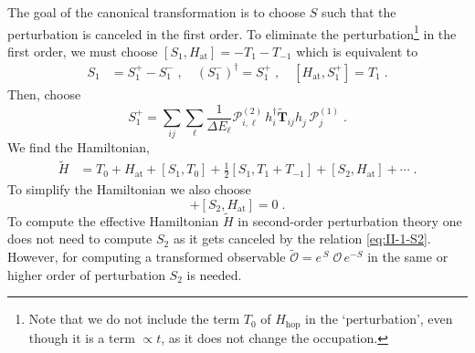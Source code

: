 The goal of the canonical transformation is to choose $S$ such that the perturbation is canceled in the first order.
To eliminate the perturbation\footnote{Note that we do not include the term $T_0$ of $H_{\text{hop}}$ in the `perturbation', even though it is a term $\propto t$, as it does not change the occupation.  } in the first order, we must choose $[S_1, H_{\text{at}}] = - T_1 - T_{-1}$ which is equivalent to
\begin{align}
    S_1 &= S_1^{+} - S_1^{-} \; ,  \quad
    (S_1^{-})^\dagger = S_1^{+} \; , \quad
    [H_{\text{at}},S_1^{+}] =   T_{ 1 } \; . \label{eq:S1}
\end{align}
Then, choose
\begin{equation}
    S_1^{+}  = \sum_{ij}\sum_{\ell} \frac{1}{\Delta E_{\ell}} \mathcal{P}^{(2)}_{i,\ell} \, h_i^\dagger  \tilde{\mathbf{T}}_{ij} h_j^{\phantom{\dagger}} \, \mathcal{P}^{(1)}_{j}  \; .
\end{equation}
We find the Hamiltonian,
\begin{equation}
    \begin{split}
        \tilde{H} &=   T_0 + H_{\text{at}} +  [S_1, T_0]  + \frac{1}{2} [S_1, T_1 + T_{-1}] + [S_2, H_{\text{at}}] + \cdots \; .
\end{split}
\end{equation}
To simplify the Hamiltonian we also choose
\begin{equation}
     [S_1, T_0]  +
     [S_2, H_{\text{at}}] = 0 \; . \label{eq:II-1-S2}
\end{equation}
To compute the effective Hamiltonian $\tilde{H}$ in second-order perturbation theory one does not need to compute $S_2$ as it gets canceled by the relation \eqref{eq:II-1-S2}. However, for computing a transformed observable
$\tilde{\mathcal{O}} = e^{\, S}  \;  \mathcal{O} \, e^{-S}$ in the same or higher order of perturbation $S_2$ is needed.%

